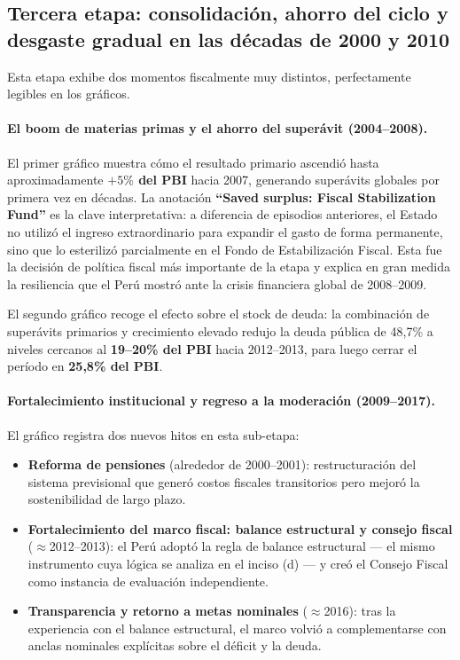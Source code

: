 \documentclass[12pt, a4paper]{article}
\newcommand{\emp}[1]{\textbf{#1}}
\begin{document}
\subsection{Tercera etapa: consolidación, ahorro del ciclo y
            desgaste gradual en las décadas de 2000 y 2010}

Esta etapa exhibe dos momentos fiscalmente muy distintos, perfectamente
legibles en los gráficos.

\paragraph{El boom de materias primas y el ahorro del superávit (2004--2008).}
El primer gráfico muestra cómo el resultado primario ascendió hasta
aproximadamente \emp{$+5\%$ del PBI} hacia 2007, generando superávits
globales por primera vez en décadas. La anotación \emp{``Saved surplus:
Fiscal Stabilization Fund''} es la clave interpretativa: a diferencia de
episodios anteriores, el Estado no utilizó el ingreso extraordinario para
expandir el gasto de forma permanente, sino que lo esterilizó parcialmente
en el Fondo de Estabilización Fiscal. Esta fue la decisión de política fiscal
más importante de la etapa y explica en gran medida la resiliencia que el
Perú mostró ante la crisis financiera global de 2008--2009.

El segundo gráfico recoge el efecto sobre el stock de deuda: la combinación
de superávits primarios y crecimiento elevado redujo la deuda pública de
48{,}7\% a niveles cercanos al \emp{19--20\% del PBI} hacia 2012--2013,
para luego cerrar el período en \emp{25{,}8\% del PBI}.

\paragraph{Fortalecimiento institucional y regreso a la moderación (2009--2017).}
El gráfico registra dos nuevos hitos en esta sub-etapa:

\begin{itemize}[leftmargin=1.5em]
    \item \emp{Reforma de pensiones} (alrededor de 2000--2001): restructuración
          del sistema previsional que generó costos fiscales transitorios pero
          mejoró la sostenibilidad de largo plazo.
    \item \emp{Fortalecimiento del marco fiscal: balance estructural y
          consejo fiscal} ($\approx$2012--2013): el Perú adoptó la regla de
          balance estructural --- el mismo instrumento cuya lógica se analiza
          en el inciso (d) --- y creó el Consejo Fiscal como instancia de
          evaluación independiente.
    \item \emp{Transparencia y retorno a metas nominales} ($\approx$2016):
          tras la experiencia con el balance estructural, el marco volvió a
          complementarse con anclas nominales explícitas sobre el déficit y
          la deuda.
\end{itemize}
\end{document}
